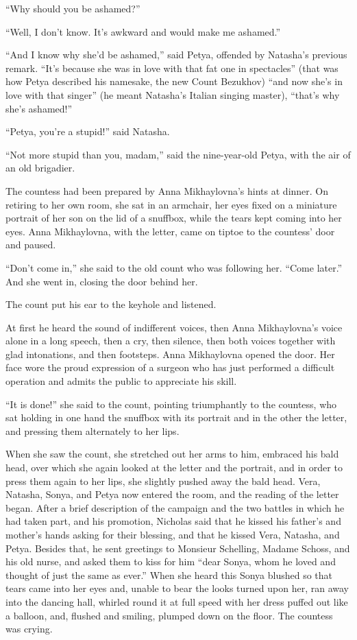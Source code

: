 ``Why should you be ashamed?''

``Well, I don't know. It's awkward and would make me ashamed.''

``And I know why she'd be ashamed,'' said Petya, offended by
Natasha's previous remark. ``It's because she was in love with
that fat one in spectacles'' (that was how Petya described his
namesake, the new Count Bezukhov) ``and now she's in love with
that singer'' (he meant Natasha's Italian singing master),
``that's why she's ashamed!''

``Petya, you're a stupid!'' said Natasha.

``Not more stupid than you, madam,'' said the nine-year-old
Petya, with the air of an old brigadier.

The countess had been prepared by Anna Mikhaylovna's hints at
dinner. On retiring to her own room, she sat in an armchair, her
eyes fixed on a miniature portrait of her son on the lid of a
snuffbox, while the tears kept coming into her eyes. Anna
Mikhaylovna, with the letter, came on tiptoe to the countess'
door and paused.

``Don't come in,'' she said to the old count who was following
her. ``Come later.'' And she went in, closing the door behind
her.

The count put his ear to the keyhole and listened.

At first he heard the sound of indifferent voices, then Anna
Mikhaylovna's voice alone in a long speech, then a cry, then
silence, then both voices together with glad intonations, and
then footsteps.  Anna Mikhaylovna opened the door. Her face wore
the proud expression of a surgeon who has just performed a
difficult operation and admits the public to appreciate his
skill.

``It is done!'' she said to the count, pointing triumphantly to
the countess, who sat holding in one hand the snuffbox with its
portrait and in the other the letter, and pressing them
alternately to her lips.

When she saw the count, she stretched out her arms to him,
embraced his bald head, over which she again looked at the letter
and the portrait, and in order to press them again to her lips,
she slightly pushed away the bald head. Vera, Natasha, Sonya, and
Petya now entered the room, and the reading of the letter
began. After a brief description of the campaign and the two
battles in which he had taken part, and his promotion, Nicholas
said that he kissed his father's and mother's hands asking for
their blessing, and that he kissed Vera, Natasha, and Petya.
Besides that, he sent greetings to Monsieur Schelling, Madame
Schoss, and his old nurse, and asked them to kiss for him ``dear
Sonya, whom he loved and thought of just the same as ever.'' When
she heard this Sonya blushed so that tears came into her eyes
and, unable to bear the looks turned upon her, ran away into the
dancing hall, whirled round it at full speed with her dress
puffed out like a balloon, and, flushed and smiling, plumped down
on the floor. The countess was crying.

